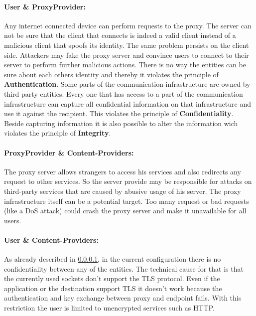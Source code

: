 \documentclass[12pt, a4paper]{scrartcl}
\begin{document}
\paragraph{User \& ProxyProvider:}\label{ssec::user}
\noindent Any internet connected device can perform requests to the proxy. The server can not be sure that the client that connects is indeed a valid client instead of a malicious client that spoofs its identity. The same problem persists on the client side. Attackers may fake the proxy server and convince users to connect to their server to perform further malicious actions. There is no way the entities can be sure about each others identity and thereby it violates the principle of \textbf{Authentication}.\newline
Some parts of the communication infrastructure are owned by third party entities. Every one that has access to a part of the communication infrastructure can capture all confidential information on that infrastructure and use it against the recipient. This violates the principle of \textbf{Confidentiality}.\newline
Beside capturing information it is also possible to alter the information wich violates the principle of \textbf{Integrity}.
\paragraph{ProxyProvider \& Content-Providers:}
The proxy server allows strangers to access his services and also redirects any request to other services. So the server provide may be responsible for attacks on third-party services that are caused by abusive usage of his server.\newline
The proxy infrastructure itself can be a potential target. Too many request or bad requests (like a \ac{DoS} attack) could crash the proxy server and make it unavailable for all users.
\paragraph{User \& Content-Providers:}
As already described in \@\ref{ssec::user}, in the current configuration there is no confidentiality between any of the entities. The technical cause for that is that the currently used sockets don't support the \ac{TLS} protocol. Even if the application or the destination support \ac{TLS} it doesn't work because the authentication and key exchange between proxy and endpoint fails. With this restriction the user is limited to unencrypted services such as \acs{HTTP}.
\end{document}
